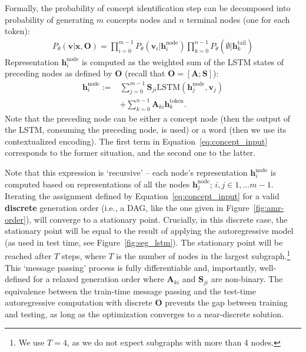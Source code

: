 \documentclass[11pt]{article}
\begin{document}
\label{sec:seg_concept_generation}
Formally, the probability of concept identification step can be decomposed into probability of generating $m$ concepts nodes and $n$ terminal nodes (one for each token):
\begin{align}
P_\theta(\mathbf{v}|\mathbf{x},\!\mathbf{O}\!)\!\!=\!\!\prod_{i=0}^{m-1}\!\!P_\theta(\mathbf{v}_i|\mathbf{h}^{\mathrm{node}}_i) \!  \prod_{k=0}^{n-1}\!P_\theta(\emptyset |\mathbf{h}^{\mathrm{tail}}_k)
    \label{eq:prob}
\end{align}
Representation
$\mathbf{h}^{\mathrm{node}}_i$ is computed as the weighted sum of the LSTM states of preceding nodes as defined by $\mathbf{O}$ (recall that $\mathbf{O} = [ \mathbf{A} ; \mathbf{S} ]$):
\begin{align}
\nonumber
 \mathbf{h}^{\mathrm{node}}_i := 
 &  \sum_{j=0}^{m-1}  \mathbf{S}_{ji}\mathrm{LSTM}{(\mathbf{h}^{\mathrm{node}}_j,\mathbf{v}_j)} \\
     & +  \sum_{k=0}^{n-1} \mathbf{A}_{ki}\mathbf{h}^{\mathrm{token}}_k. \label{eq:concept_input}
\end{align}
Note that the preceding node can be either a concept node (then the output of the LSTM, consuming the preceding node, is used)
or a word (then we use its contextualized encoding). The first term in Equation~\ref{eq:concept_input} corresponds to the former situation, and the second one to the latter.   

Note that this expression is `recursive' -- each node's representation $\mathbf{h}^{\mathrm{node}}_i$ is computed based on representations of all the nodes $\mathbf{h}^{\mathrm{node}}_j$; $i, j \in 1, \ldots m-1$. Iterating  the assignment defined by Equation~\ref{eq:concept_input} 
  for a valid {\bf discrete} generation order (i.e., a DAG, like the one given in Figure~\ref{fig:amr-order}), 
 will converge to a stationary point. Crucially, in this discrete case, the stationary point will be equal to the result of applying the autoregressive model (as used in test time, see  Figure~\ref{fig:seg_lstm}). The stationary point will be reached after $T$ steps, where $T$ is the number of nodes in the largest subgraph.\footnote{We use  $T=4$, as we do not expect subgraphs with more than 4 nodes.} 
 This `message passing' process is fully differentiable and, importantly, well-defined for a relaxed generation order where $\mathbf{A}_{ki}$ and  $\mathbf{S}_{ji}$ are non-binary.  The equivalence between the train-time message passing and the test-time autoregressive computation with discrete $\mathbf{O}$
prevents the gap between training and testing, as long as the optimization  converges to a near-discrete solution.
 
\end{document}
